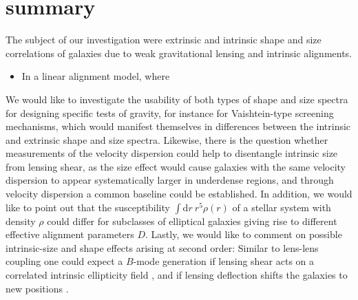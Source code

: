 \documentclass[a4paper,fleqn,usenatbib]{mnras}
\newcommand{\dd}{\mathrm{d}}
\begin{document}
\section{summary}\label{sect_summary}
The subject of our investigation were extrinsic and intrinsic shape and size correlations of galaxies due to weak gravitational lensing and intrinsic alignments. 
\begin{itemize}
\item{In a linear alignment model, where}
\end{itemize}
We would like to investigate the usability of both types of shape and size spectra for designing specific tests of gravity, for instance for Vaishtein-type screening mechanisms, which would manifest themselves in differences between the intrinsic and extrinsic shape and size spectra. Likewise, there is the question whether measurements of the velocity dispersion could help to disentangle intrinsic size from lensing shear, as the size effect would cause galaxies with the same velocity dispersion to appear systematically larger in underdense regions, and through velocity dispersion a common baseline could be established. In addition, we would like to point out that the susceptibility $\int\dd r\:r^5\rho(r)$ of a stellar system with density $\rho$ could differ for subclasses of elliptical galaxies giving rise to different effective alignment parameters $D$. Lastly, we would like to comment on possible intrinsic-size and shape effects arising at second order: Similar to lens-lens coupling one could expect a $B$-mode generation if lensing shear acts on a correlated intrinsic ellipticity field \citep[similar to][]{cooray_second-order_2002}, and if lensing deflection shifts the galaxies to new positions \citep{giahi_evolution_2013,giahi-saravani_weak_2014}. 
\end{document}
